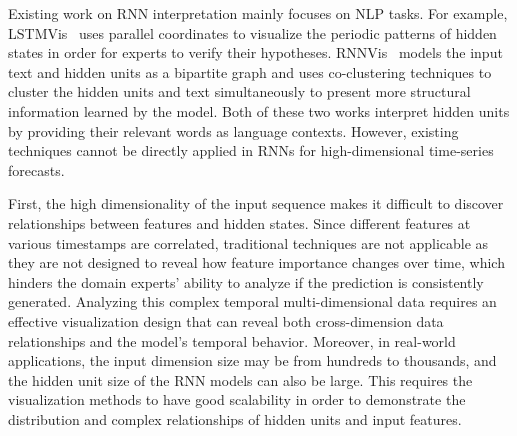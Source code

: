 Existing work on RNN interpretation mainly focuses on NLP tasks. 
For example, LSTMVis~\cite{strobelt2018lstmvis} uses parallel coordinates to visualize the periodic patterns of hidden states in order for experts to verify their hypotheses.
RNNVis~\cite{ming2017understanding} models the input text and hidden units as a bipartite graph and uses co-clustering techniques to cluster the hidden units and text simultaneously to present more structural information learned by the model. 
Both of these two works interpret hidden units by providing their relevant words as language contexts.
However, existing techniques cannot be directly applied in RNNs for high-dimensional time-series forecasts.


First, the high dimensionality of the input sequence makes it difficult to discover relationships between features and hidden states. 
Since different features at various timestamps are correlated, traditional techniques are not applicable as they are not designed to reveal how feature importance changes over time, which hinders the domain experts' ability to analyze if the prediction is consistently generated.
Analyzing this complex temporal multi-dimensional data requires an effective visualization design that can reveal both cross-dimension data relationships and the model's temporal behavior.
Moreover, in real-world applications, the input dimension size may be from hundreds to thousands, and the hidden unit size of the RNN models can also be large.
This requires the visualization methods to have good scalability in order to demonstrate the distribution and complex relationships of hidden units and input features.




